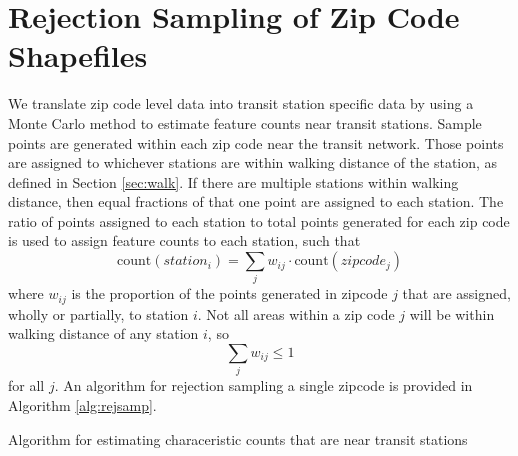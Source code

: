 \documentclass[11pt]{report}
\begin{document}
\section{Rejection Sampling of Zip Code Shapefiles}\label{sec:sampling}

We translate zip code level data into transit station specific data by using a Monte Carlo method to estimate feature counts near transit stations. Sample points are generated within each zip code near the transit network. Those points are assigned to whichever stations are within walking distance of the station, as defined in Section \ref{sec:walk}. If there are multiple stations within walking distance, then equal fractions of that one point are assigned to each station. The ratio of points assigned to each station to total points generated for each zip code is used to assign feature counts to each station, such that
\[\text{count}(station_i) = \sum_j w_{ij} \cdot \text{count}(zipcode_j)\]
where $w_{ij}$ is the proportion of the points generated in zipcode $j$ that are assigned, wholly or partially, to station $i$. Not all areas within a zip code $j$ will be within walking distance of any station $i$, so 
\[\sum_j w_{ij} \leq 1\] for all $j$. An algorithm for rejection sampling a single zipcode is provided in Algorithm \ref{alg:rejsamp}.


\begin{algorithm}\begingroup\fontsize{10}{10}\selectfont
\begin{algorithmic}
	\EndIf
\EndWhile
{}
		\EndFor
		\EndFor
	\EndIf
\EndFor
\end{algorithmic}\endgroup\caption{Algorithm for estimating characeristic counts that are near transit stations}\label{alg:rejsamp}
\end{algorithm}
\end{document}
